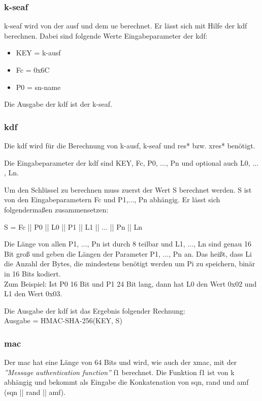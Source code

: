 \subsubsection{\gls{k-seaf}}
\gls{k-seaf} wird von der \gls{ausf} und dem \gls{ue} berechnet.
Er l\"asst sich mit Hilfe der \gls{kdf} berechnen.
Dabei sind folgende Werte Eingabeparameter der \gls{kdf}: %
\begin{itemize}
\item KEY = \gls{k-ausf}
\item Fc = 0x6C
\item P0 = \gls{sn-name}
\end{itemize}
Die Ausgabe der \gls{kdf} ist der \gls{k-seaf}.

\subsubsection{\gls{kdf}}
Die \gls{kdf} wird f\"ur die Berechnung von \gls{k-ausf}, \gls{k-seaf} und \gls{res*} bzw. \gls{xres*} ben\"otigt.

Die Eingabeparameter der \gls{kdf} sind KEY, Fc, P0, $ \dots $, Pn und optional auch L0, $ \dots $, Ln.

Um den Schl\"ussel zu berechnen muss zuerst der Wert S berechnet werden. %
S ist von den Eingabeparametern Fc und P1,$ \dots $, Pn abh\"angig.
Er l\"asst sich folgenderma{\ss}en zusammensetzen: 

S = Fc || P0 || L0 || P1 || L1 || $ \dots $ || Pn || Ln 

Die L\"ange von allen P1, $ \dots $, Pn ist durch 8 teilbar und L1, $ \dots $, Ln sind genau 16 Bit gro{\ss} und geben die L\"angen der Parameter P1, $ \dots $, Pn an. 
Das hei{\ss}t, dass Li die Anzahl der Bytes, die mindestens ben\"otigt werden um Pi zu speichern, bin\"ar in 16 Bits kodiert. \\
Zum Beispiel: Ist P0 16 Bit und P1 24 Bit lang, dann hat L0 den Wert 0x02 und L1 den Wert 0x03.

Die Ausgabe der \gls{kdf} ist das Ergebnis folgender Rechnung: \\
Ausgabe = HMAC-SHA-256(KEY, S) \\

\subsubsection{\gls{mac}}
Der \gls{mac} hat eine L\"ange von 64 Bits und wird, wie auch der \gls{xmac}, mit der \textit{''Message authentication function''} f1 berechnet. %
Die Funktion f1 ist von \gls{k} abh\"angig und bekommt als Eingabe die Konkatenation von \gls{sqn}, \gls{rand} und \gls{amf} (\gls{sqn} || \gls{rand} || \gls{amf}). %

